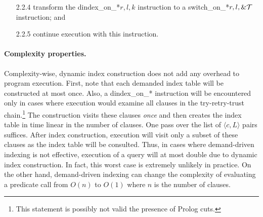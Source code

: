 \documentclass{llncs}
\newcommand{\instr}[1]{\textsf{#1}}
\newcommand{\TryRetryTrust}{\mbox{\instr{try-retry-trust}}\xspace}
\newcommand{\fail}{\instr{fail}\xspace}
\newcommand{\jump}{\instr{jump}\xspace}
\newcommand{\jitiSTAR}{\mbox{\instr{dindex\_on\_*}}\xspace}
\newcommand{\switchSTAR}{\mbox{\instr{switch\_on\_*}}\xspace}
\newcommand{\JITI}{demand-driven indexing\xspace}
\begin{document}
\begin{Algorithm}[t]
\begin{enumerate}
\begin{enumerate}
\begin{itemize}
\begin{itemize}
\begin{itemize}
	    of pairs into sequences of labels ${\cal L}_c, {\cal L}_l$
	    and ${\cal L}_s$ for constants, lists and structures,
	    respectively;
	  \item for each of the four sequences ${\cal L}, {\cal L}_c,
	    {\cal L}_l, {\cal L}_s$ of labels create code as follows:
	    \begin{itemize}
	    \item the instruction \fail if the sequence is empty;
	    \item the instruction \jump $L$ if $L$ is the only label in
	      the sequence;
	    \item the sequence of instructions obtained by appending to
	      $\cal I$ a \TryRetryTrust chain for the current sequence
	      of labels;
	    \end{itemize}
	  \end{itemize}
	\end{itemize}
      \item[2.2.4] transform the \jitiSTAR $r, l, k$ instruction to
	a \switchSTAR $r, l, \&{\cal T}$ instruction; and
      \item[2.2.5] continue execution with this instruction.
      \end{itemize}
    \end{enumerate}
  \end{enumerate}
\end{Algorithm}

\paragraph*{Complexity properties.}
Complexity-wise, dynamic index construction does not add any overhead
to program execution. First, note that each demanded index table will
be constructed at most once. Also, a \jitiSTAR instruction will be
encountered only in cases where execution would examine all clauses in
the \TryRetryTrust chain.\footnote{This statement is possibly not
valid the presence of Prolog cuts.} The construction visits these
clauses \emph{once} and then creates the index table in time linear in
the number of clauses. One pass over the list of $\langle c, L
\rangle$ pairs suffices. After index construction, execution will
visit only a subset of these clauses as the index table will be
consulted.
Thus, in cases where \JITI is not effective, execution of a query will
at most double due to dynamic index construction. In fact, this worst
case is extremely unlikely in practice. On the other hand, \JITI can
change the complexity of evaluating a predicate call from $O(n)$ to
$O(1)$ where $n$ is the number of clauses.
\end{document}
